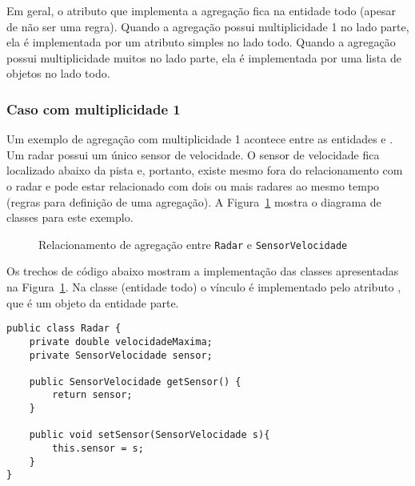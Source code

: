 Em geral, o atributo que implementa a agregação fica na entidade todo (apesar de não ser uma regra). Quando a agregação possui multiplicidade 1 no lado parte, ela é implementada por um atributo simples no lado todo. Quando a agregação possui multiplicidade muitos no lado parte, ela é implementada por uma lista de objetos no lado todo.

\subsubsection{Caso com multiplicidade 1}

Um exemplo de agregação com multiplicidade 1 acontece entre as entidades  e . Um radar possui um único sensor de velocidade. O sensor de velocidade fica localizado abaixo da pista e, portanto, existe mesmo fora do relacionamento com o radar e pode estar relacionado com dois ou mais radares ao mesmo tempo (regras para definição de uma agregação). A Figura~\ref{fig:agregacao-radar-sensor} mostra o diagrama de classes para este exemplo.

\begin{figure}[h]
	\centering
	
	
	\caption{Relacionamento de agregação entre \texttt{Radar} e \texttt{SensorVelocidade}}
	\label{fig:agregacao-radar-sensor}
\end{figure}

Os trechos de código abaixo mostram a implementação das classes apresentadas na Figura~\ref{fig:agregacao-radar-sensor}. Na classe  (entidade todo) o vínculo é implementado pelo atributo , que é um objeto da entidade parte.

\begin{verbatim}
public class Radar {
	private double velocidadeMaxima;
	private SensorVelocidade sensor;
	
	public SensorVelocidade getSensor() {
		return sensor;
	}
	
	public void setSensor(SensorVelocidade s){
		this.sensor = s;
	}
}
\end{verbatim}
 
